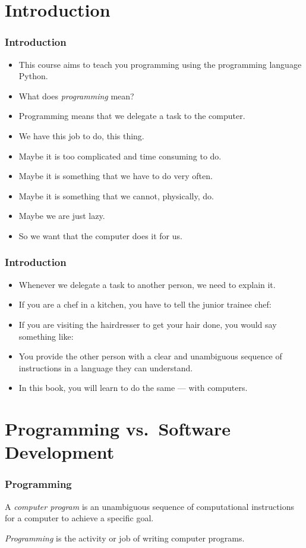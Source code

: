 \documentclass[aspectratio=169,mathserif,notheorems]{beamer}%
\subtitle{Introduction}%
\begin{document}
%
%
\startPresentation%
%
\section{Introduction}%
%
\begin{frame}%
\frametitle{Introduction}%
\begin{itemize}%
\item This course aims to teach you programming using the programming language Python.%
\item<2-> What does \emph{programming} mean?%
\item<3-> Programming means that we delegate a task to the computer.%
\item<4-> We have this job to do, this thing.%
\item<5-> Maybe it is too complicated and time consuming to do.%
\item<6-> Maybe it is something that we have to do very often.%
\item<7-> Maybe it is something that we cannot, physically, do.%
\item<8-> Maybe we are just lazy.%
\item<9-> So we want that the computer does it for us.%
\end{itemize}%
\end{frame}%
%
\begin{frame}%
\frametitle{Introduction}%
\begin{itemize}%
\item Whenever we delegate a task to another person, we need to explain it.%
\item<2-> If you are a chef in a kitchen, you have to tell the junior trainee chef: %
\item<3-> If you are visiting the hairdresser to get your hair done, you would say something like:
\item<4-> You provide the other person with a clear and unambiguous sequence of instructions in a language they can understand.%
\item<5-> In this book, you will learn to do the same --- with computers.%
\end{itemize}%
\end{frame}%
%
%
\section{Programming vs.\ Software Development}%
%
\begin{frame}%
\frametitle{Programming}%
%
\begin{definition}%
A \emph{computer program} is an unambiguous sequence of computational instructions for a computer to achieve a specific goal.%
\end{definition}%
%
\begin{definition}[Programming]%
\label{def:programming}
\emph{Programming} is the activity or job of writing computer programs\cite{CDE:PMOPIE}.%
\end{definition}%
%
\end{frame}%
%
\end{document}
